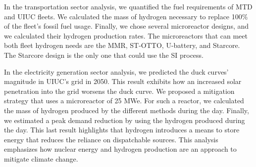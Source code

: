 In the transportation sector analysis, we quantified the fuel requirements of \gls{MTD} and \gls{UIUC} fleets.
We calculated the mass of hydrogen necessary to replace 100$\%$ of the fleet's fossil fuel usage.
Finally, we chose several microreactor designs, and we calculated their hydrogen production rates.
The microreactors that can meet both fleet hydrogen needs are the MMR, ST-OTTO, U-battery, and Starcore.
The Starcore design is the only one that could use the \gls{SI} process.

In the electricity generation sector analysis, we predicted the duck curves' magnitude in UIUC's grid in 2050.
This result exhibits how an increased solar penetration into the grid worsens the duck curve.
We proposed a mitigation strategy that uses a microreactor of 25 MWe.
For such a reactor, we calculated the mass of hydrogen produced by the different methods during the day.
Finally, we estimated a peak demand reduction by using the hydrogen produced during the day.
This last result highlights that hydrogen introduces a means to store energy that reduces the reliance on dispatchable sources.
This analysis emphasizes how nuclear energy and hydrogen production are an approach to mitigate climate change.
